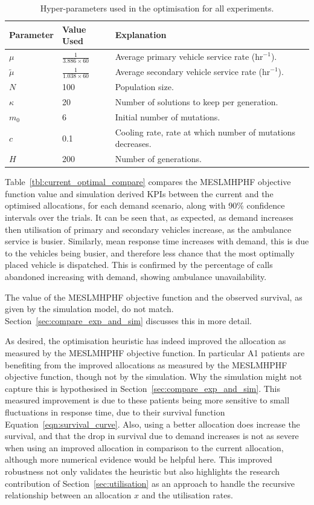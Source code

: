 \documentclass[numbers,webpdf,imaman]{ima-authoring-template}%
\begin{document}
\begin{table}
\centering
\begin{tabular}{lll}
\toprule
Parameter & Value Used & Explanation \\
\midrule
$\mu$ & $\frac{1}{3.886 \times 60}$ & Average primary vehicle service rate ($\text{hr}^{-1}$).\\
$\tilde{\mu}$ & $\frac{1}{1.038 \times 60}$ & Average secondary vehicle service rate ($\text{hr}^{-1}$).\\
$N$ & 100 & Population size.\\
$\kappa$ & 20 & Number of solutions to keep per generation.\\
$m_0$ & 6 & Initial number of mutations.\\
$c$ & 0.1 & Cooling rate, rate at which number of mutations decreases.\\
$H$ & 200 & Number of generations.\\
\bottomrule
\end{tabular}
\caption{Hyper-parameters used in the optimisation for all experiments.}
\label{tbl:hyperparameters}
\end{table}

Table~\ref{tbl:current_optimal_compare} compares the MESLMHPHF objective
function value and simulation derived KPIs between the current and the optimised
allocations, for each demand scenario, along with 90\% confidence intervals over the trials. It can be seen that, as expected, as
demand increases then utilisation of primary and secondary vehicles increase, as
the ambulance service is busier. Similarly, mean response time increases with
demand, this is due to the vehicles being busier, and therefore less chance that
the most optimally placed vehicle is dispatched. This is confirmed by the
percentage of calls abandoned increasing with demand, showing ambulance
unavailability.

The value of the MESLMHPHF objective function and
the observed survival, as given by the simulation model, do not match.
Section~\ref{sec:compare_exp_and_sim} discusses this in more detail.

As desired, the optimisation heuristic has indeed improved the
allocation as measured by the MESLMHPHF objective function. In particular A1 patients 
are benefiting from the improved
allocations as measured by the MESLMHPHF objective function,
though not by the simulation. Why the simulation might not capture this is
hypothesised in Section~\ref{sec:compare_exp_and_sim}. This measured improvement
is due to these patients being more sensitive to small fluctuations in
response time, due to their survival function Equation~\ref{eqn:survival_curve}.
Also, using a better allocation does increase the survival,
and that the drop in survival due to demand increases is not as severe when
using an improved allocation in comparison to the current allocation, although
more numerical evidence would be helpful here. This improved robustness 
not only validates the heuristic but also highlights
the research contribution of Section~\ref{sec:utilisation} as an approach to
handle the recursive relationship between an allocation \(x\) and the utilisation
rates.
\end{document}
